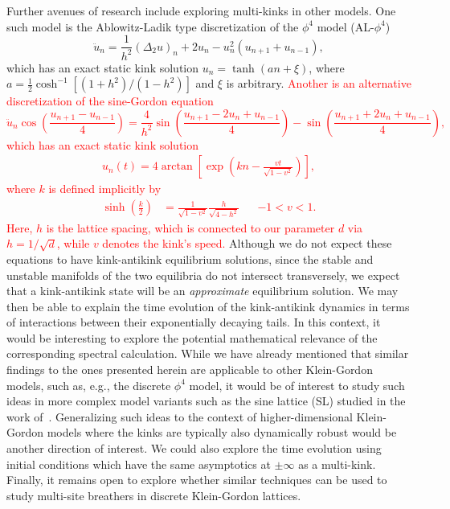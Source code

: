 \documentclass[12pt,reqno]{amsart}
\newcommand{\revised}[1]{ \textcolor{red}{#1} }
\begin{document}
Further avenues of research include exploring multi-kinks in other models. One such model is the Ablowitz-Ladik type discretization of the $\phi^4$ model (AL-$\phi^4$) \cite{kevrekidis2003}
\begin{equation}
	\ddot{u}_n = \frac{1}{h^2}(\Delta_2 u)_n + 2 u_n - u_n^2 (u_{n+1}+u_{n-1}),
\end{equation}
which has an exact static kink solution $u_n = \tanh(a n + \xi)$, where $a = \frac{1}{2} \cosh^{-1}[(1+h^2)/(1-h^2) ]$ and $\xi$ is arbitrary. \revised{Another is an alternative discretization of the sine-Gordon equation \cite{Barashenkov2008}
\begin{equation}
	\ddot{u}_n \cos \left( \frac{u_{n+1} - u_{n-1}}{4} \right) 
	= \frac{4}{h^2} \sin \left( \frac{u_{n+1} - 2 u_n + u_{n-1}}{4} \right)
	- \sin \left( \frac{u_{n+1} + 2 u_n + u_{n-1}}{4} \right),
\end{equation}
which has an exact static kink solution
\begin{align}
u_n(t) = 4\arctan\left[ \exp \left(k n - \frac{v t}{\sqrt{1 - v^2}} \right) \right],
\end{align}
where $k$ is defined implicitly by
\begin{align}
\sinh \left(\frac{k}{2}\right) &= \frac{1}{\sqrt{1 - v^2}}\frac{h}{\sqrt{4 - h^2}} && -1 < v < 1.
\end{align}
Here, $h$ is the lattice spacing, which is connected to our parameter
$d$ via $h=1/\sqrt{d}$, while $v$ denotes the kink's speed. }
Although we do not expect these equations to have kink-antikink equilibrium solutions, since the stable and unstable manifolds of the two equilibria do not intersect transversely, we expect that a kink-antikink state will be an {\it approximate} equilibrium solution. We may then be able to explain the time evolution of the kink-antikink dynamics in terms of interactions between their exponentially decaying tails. 
In this context, it would be interesting to explore the
potential mathematical relevance of the corresponding
spectral calculation.
While we have already mentioned
that similar findings to the ones presented herein
are applicable to other Klein-Gordon models, such as,
e.g., the discrete $\phi^4$ model, it would be of
interest to study such ideas in more complex model variants 
such as the sine lattice (SL) studied in the work
of~\cite{Takeno1986}. 
Generalizing such ideas to the context of higher-dimensional
Klein-Gordon models where the kinks are typically also 
dynamically robust would be another direction of interest.
{We could also explore the time evolution using initial conditions which have the same asymptotics at $\pm \infty$ as a multi-kink.}
Finally, it remains open to explore whether similar techniques 
can be used to study multi-site breathers in discrete 
Klein-Gordon lattices.
\end{document}
